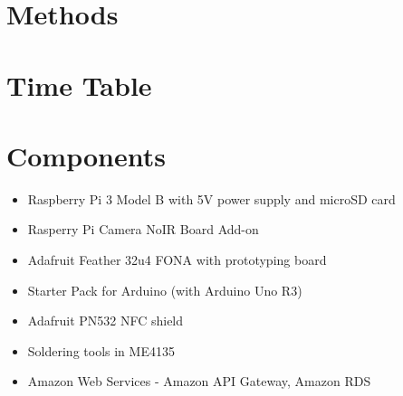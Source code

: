 \documentclass{article}
\begin{document}

\section{Methods}



\section{Time Table}



\section{Components}

\begin{itemize}
\item Raspberry Pi 3 Model B with 5V power supply and microSD card
\item Rasperry Pi Camera NoIR Board Add-on
\item Adafruit Feather 32u4 FONA with prototyping board
\item Starter Pack for Arduino (with Arduino Uno R3)
\item Adafruit PN532 NFC shield
\item Soldering tools in ME4135
\item Amazon Web Services - Amazon API Gateway, Amazon RDS
\end{itemize}

\pagebreak
\end{document}
